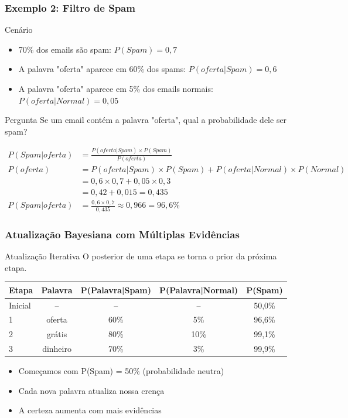 \documentclass[11pt]{beamer}
\begin{document}
\begin{frame}
\frametitle{Exemplo 2: Filtro de Spam}
\begin{block}{Cenário}
\begin{itemize}
\item 70\% dos emails são spam: $P(Spam) = 0,7$
\item A palavra "oferta" aparece em 60\% dos spams: $P(oferta|Spam) = 0,6$
\item A palavra "oferta" aparece em 5\% dos emails normais: $P(oferta|Normal) = 0,05$
\end{itemize}
\end{block}

\begin{alertblock}{Pergunta}
Se um email contém a palavra "oferta", qual a probabilidade dele ser spam?
\end{alertblock}

\begin{align*}
P(Spam|oferta) &= \frac{P(oferta|Spam) \times P(Spam)}{P(oferta)} \\[8pt]
P(oferta) &= P(oferta|Spam) \times P(Spam) + P(oferta|Normal) \times P(Normal) \\
&= 0,6 \times 0,7 + 0,05 \times 0,3 \\
&= 0,42 + 0,015 = 0,435 \\[8pt]
P(Spam|oferta) &= \frac{0,6 \times 0,7}{0,435} \approx 0,966 = 96,6\%
\end{align*}
\end{frame}

\begin{frame}
\frametitle{Atualização Bayesiana com Múltiplas Evidências}
\begin{block}{Atualização Iterativa}
O posterior de uma etapa se torna o prior da próxima etapa.
\end{block}

\begin{center}
\begin{tabular}{|l|c|c|c|c|}
\hline
\textbf{Etapa} & \textbf{Palavra} & \textbf{P(Palavra|Spam)} & \textbf{P(Palavra|Normal)} & \textbf{P(Spam)} \\
\hline
Inicial & -- & -- & -- & 50,0\% \\
\hline
1 & oferta & 60\% & 5\% & 96,6\% \\
\hline
2 & grátis & 80\% & 10\% & 99,1\% \\
\hline
3 & dinheiro & 70\% & 3\% & 99,9\% \\
\hline
\end{tabular}
\end{center}

\begin{itemize}
\item Começamos com P(Spam) = 50\% (probabilidade neutra)
\item Cada nova palavra atualiza nossa crença
\item A certeza aumenta com mais evidências
\end{itemize}
\end{frame}
\end{document}

